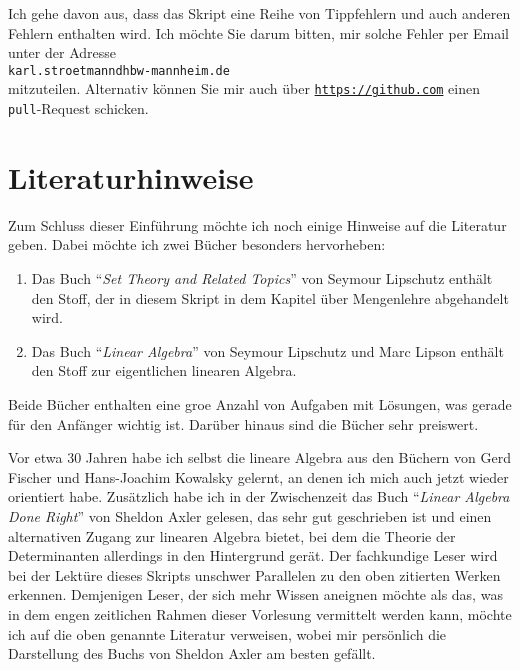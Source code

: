 \remark
Ich gehe davon aus,  dass das  Skript eine Reihe von Tippfehlern und auch anderen Fehlern enthalten
wird.  Ich m\"{o}chte Sie darum bitten, mir solche Fehler per Email unter der Adresse
\\[0.2cm]
\hspace*{1.3cm}
\texttt{karl.stroetmanndhbw-mannheim.de}
\\[0.2cm]
mitzuteilen.  Alternativ k\"{o}nnen Sie mir auch \"{u}ber
\href{https://github.com}{\texttt{https://github.com}} einen \texttt{pull}-Request schicken.

\section{Literaturhinweise}
Zum Schluss dieser Einf\"{u}hrung m\"{o}chte ich noch einige Hinweise auf die Literatur geben.  Dabei m\"{o}chte
ich zwei B\"{u}cher besonders hervorheben:
\begin{enumerate}
\item Das Buch ``\emph{Set Theory and Related Topics}'' von Seymour Lipschutz \cite{lipschutz:1998} enth\"{a}lt den Stoff, der
      in diesem Skript in dem Kapitel \"{u}ber Mengenlehre abgehandelt wird.
\item Das Buch ``\emph{Linear Algebra}'' von Seymour Lipschutz und Marc Lipson \cite{lipschutz:2012}
      enth\"{a}lt den Stoff zur eigentlichen linearen Algebra.
\end{enumerate}
Beide B\"{u}cher enthalten eine gro\3e Anzahl von Aufgaben mit L\"{o}sungen, was gerade f\"{u}r den Anf\"{a}nger
wichtig ist.  Dar\"{u}ber hinaus sind die B\"{u}cher
sehr preiswert.  

Vor etwa 30 Jahren habe ich selbst die lineare Algebra aus den B\"{u}chern von Gerd Fischer
\cite{fischer:2008} und Hans-Joachim Kowalsky \cite{kowalsky:2003} gelernt, an denen ich mich auch
jetzt wieder orientiert habe.  Zus\"{a}tzlich habe ich in der Zwischenzeit das Buch 
``\emph{Linear Algebra Done Right}'' von Sheldon Axler \cite{axler:1997} gelesen, das sehr gut geschrieben ist
und einen alternativen Zugang zur linearen Algebra bietet, bei dem die Theorie der Determinanten
allerdings in den Hintergrund ger\"{a}t.  Der fachkundige Leser wird bei der Lekt\"{u}re dieses Skripts
unschwer Parallelen zu den oben zitierten Werken erkennen.   Demjenigen Leser, der sich mehr Wissen
aneignen m\"{o}chte als das, was in dem engen zeitlichen Rahmen dieser Vorlesung vermittelt werden kann,
m\"{o}chte ich auf die oben genannte Literatur verweisen, wobei mir pers\"{o}nlich die Darstellung des Buchs
von Sheldon Axler am besten gef\"{a}llt. 


